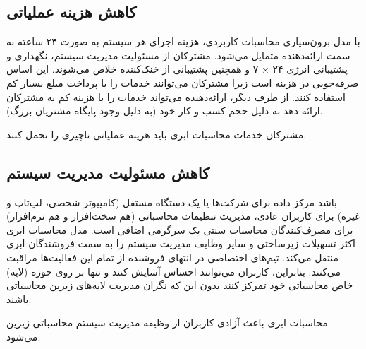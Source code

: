 \documentclass{book}
\begin{document}
            \subsection{کاهش هزینه عملیاتی}

                با مدل برون‌سپاری محاسبات کاربردی، هزینه اجرای هر سیستم به صورت ۲۴ ساعته به سمت ارائه‌دهنده متمایل می‌شود. مشترکان از مسئولیت مدیریت سیستم، نگهداری و پشتیبانی انرژی ۲۴ × ۷ و همچنین پشتیبانی از خنک‌کننده خلاص می‌شوند. این اساس صرفه‌جویی در هزینه است زیرا مشترکان می‌توانند خدمات را با پرداخت مبلغ بسیار کم استفاده کنند. از طرف دیگر، ارائه‌دهنده می‌تواند خدمات را با هزینه کم به مشترکان ارائه دهد به دلیل حجم کسب و کار خود (به دلیل وجود پایگاه مشتریان بزرگ).

                \begin{addinfo}
                    
                    مشترکان خدمات محاسبات ابری باید هزینه عملیاتی ناچیزی را تحمل کنند.

                \end{addinfo}

            \subsection{کاهش مسئولیت مدیریت سیستم}

                باشد مرکز داده برای شرکت‌ها یا یک دستگاه مستقل (کامپیوتر شخصی، لپ‌تاپ و غیره) برای کاربران عادی، مدیریت تنظیمات محاسباتی (هم سخت‌افزار و هم نرم‌افزار) برای مصرف‌کنندگان محاسبات سنتی یک سرگرمی اضافی است. مدل محاسبات ابری اکثر تسهیلات زیرساختی و سایر وظایف مدیریت سیستم را به سمت فروشندگان ابری منتقل می‌کند. تیم‌های اختصاصی در انتهای فروشنده از تمام این فعالیت‌ها مراقبت می‌کنند. بنابراین، کاربران می‌توانند احساس آسایش کنند و تنها بر روی حوزه (لایه) خاص محاسباتی خود تمرکز کنند بدون این که نگران مدیریت لایه‌های زیرین محاسباتی باشند.

                \begin{addinfo}
                    
                    محاسبات ابری باعث آزادی کاربران از وظیفه مدیریت سیستم محاسباتی زیرین می‌شود.

                \end{addinfo}
                

\end{document}
